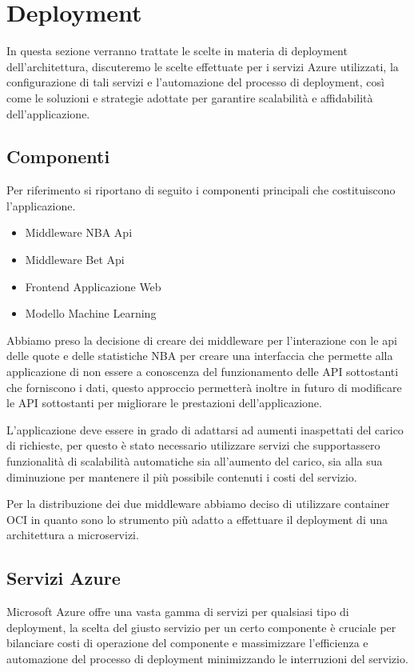 \section{Deployment}
In questa sezione verranno trattate le scelte in materia di deployment dell'architettura, discuteremo le scelte effettuate per i servizi Azure utilizzati, la configurazione di tali servizi e l'automazione del processo di deployment, così come le soluzioni e strategie adottate per garantire scalabilità e affidabilità dell'applicazione.

\subsection{Componenti}
Per riferimento si riportano di seguito i componenti principali che costituiscono l'applicazione.
\begin{itemize}
    \item Middleware NBA Api
    \item Middleware Bet Api
    \item Frontend Applicazione Web
    \item Modello Machine Learning
\end{itemize}

Abbiamo preso la decisione di creare dei middleware per l'interazione con le api delle quote e delle statistiche NBA per creare una interfaccia che permette alla applicazione di non essere a conoscenza del funzionamento delle API sottostanti che forniscono i dati, questo approccio permetterà inoltre in futuro di modificare le API sottostanti per migliorare le prestazioni dell'applicazione.

L'applicazione deve essere in grado di adattarsi ad aumenti inaspettati del carico di richieste, per questo è stato necessario utilizzare servizi che supportassero funzionalità di scalabilità automatiche sia all'aumento del carico, sia alla sua diminuzione per mantenere il più possibile contenuti i costi del servizio.

Per la distribuzione dei due middleware abbiamo deciso di utilizzare container OCI in quanto sono lo strumento più adatto a effettuare il deployment di una architettura a microservizi.

\subsection{Servizi Azure}

Microsoft Azure offre una vasta gamma di servizi per qualsiasi tipo di deployment, la scelta del giusto servizio per un certo componente è cruciale per bilanciare costi di operazione del componente e massimizzare l'efficienza e automazione del processo di deployment minimizzando le interruzioni del servizio.

